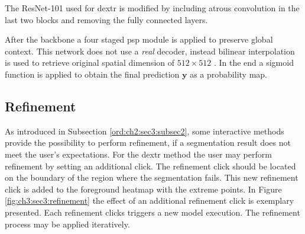 The ResNet-101 used for \gls{dextr} is modified by including atrous convolution in the last two blocks and removing the fully connected layers.

After the backbone a four staged \gls{psp} module is applied to preserve global context.
This network does not use a \textit{real} decoder, instead bilinear interpolation is used to retrieve original spatial dimension of $512 \times 512$ .
In the end a sigmoid function is applied to obtain the final prediction $\textbf{y}$ as a  probability map.

\subsection{Refinement}\label{ord:ch3:sec3:subsec4}

As introduced in Subsection \ref{ord:ch2:sec3:subsec2}, some interactive methods provide the possibility to perform refinement, if a segmentation result does not meet the user's expectations.
For the \gls{dextr} method the user may perform refinement by setting an additional click.
The refinement click should be located on the boundary of the region where the segmentation fails.
This new refinement click is added to the foreground heatmap with the extreme points.
In Figure \ref{fig:ch3:sec3:refinement} the effect of an additional refinement click is exemplary presented.
Each refinement clicks triggers a new model execution.
The refinement process may be applied iteratively.

